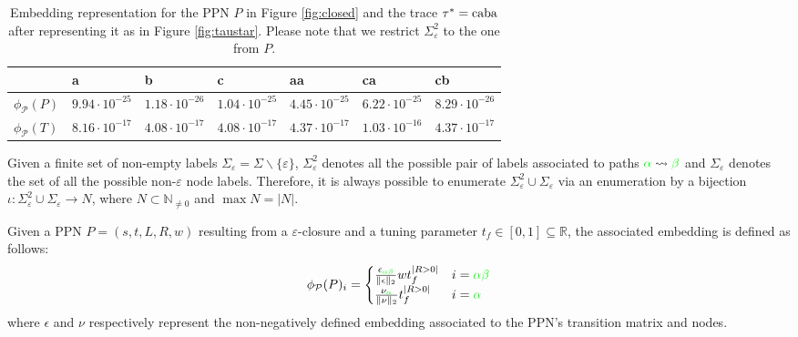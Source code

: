 \begin{table}[!t]
	\centering
	\caption{Embedding representation for the PPN $P$ in Figure \ref{fig:closed} and the trace $\tau^*=\textup{caba}$ after representing it as in Figure \ref{fig:taustar}. Please note that we restrict $\Sigma_\varepsilon^2$ to the one from $P$.}\label{tab:emb1}
		\begin{tabular}{l|l|l|l|l|l|l|}
	\toprule
	& a    & b                                                   & c    & aa   & ca   & cb   \\
	\midrule
	$\phi_{\mathcal{P}}(P)$ & $9.94\cdot10^{-25}$ & $1.18\cdot 10^{-26}$ & $1.04\cdot10^{-25}$ & $4.45\cdot 10^{-25}$ & $6.22\cdot10^{-25}$ & $8.29\cdot10^{-26}$\\
	$\phi_{\mathcal{P}}(T)$ & $8.16\cdot10^{-17}$ & $4.08\cdot 10^{-17}$ & $4.08\cdot10^{-17}$ & $4.37\cdot 10^{-17}$ & $1.03\cdot10^{-16}$ & $4.37\cdot10^{-17}$\\
	\bottomrule
\end{tabular}
\end{table}
\begin{definition}\label{def:ppne}
Given a finite set of non-empty labels $\Sigma_\varepsilon =\Sigma\backslash\{\varepsilon\}$, $\Sigma_\varepsilon^2$ denotes all the possible pair of labels associated to paths ${\color{green}\alpha}\rightsquigarrow{\color{green}\beta}$ and $\Sigma_\varepsilon$ denotes the set of all the possible non-$\varepsilon$ node labels. Therefore, it is always possible to enumerate $\Sigma_\varepsilon^2\cup\Sigma_\varepsilon$ via an enumeration by a bijection $\iota\colon \Sigma_\varepsilon^2\cup\Sigma_\varepsilon\to  N$, where $N\subset \mathbb{N}_{\neq 0}$ and $\max N=|N|$.
	
Given a PPN $P=(s,t,L,R,w)$ resulting from a $\varepsilon$-closure and a tuning parameter $t_f\in[0,1]\subseteq\mathbb{R}$, the associated embedding is defined as follows:
$$\phi_{\mathcal{P}}(P)_i=\begin{cases}
	\frac{\epsilon_{\color{green}\alpha\beta}}{\|\epsilon\|_2}wt_f^{|R>0|} & i={\color{green}\alpha\beta}\\
	\frac{\nu_{\color{green}\alpha}}{\|\nu\|_2}t_f^{|R>0|} & i={\color{green}\alpha}\\
\end{cases}$$
where $\epsilon$ and $\nu$ respectively represent the non-negatively defined embedding associated to the PPN's transition matrix and nodes. 
\end{definition}

